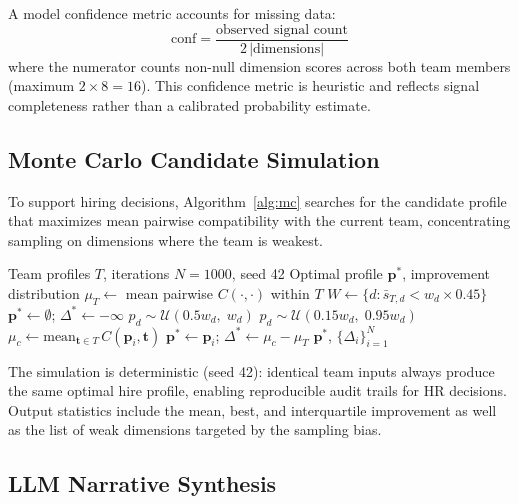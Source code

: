 \documentclass[conference]{IEEEtran}
\begin{document}
A model confidence metric accounts for missing data:
\begin{equation}
  \text{conf} = \frac{\text{observed signal count}}{2 \, |\text{dimensions}|}
  \label{eq:conf}
\end{equation}
where the numerator counts non-null dimension scores across both
team members (maximum $2 \times 8 = 16$).  This confidence metric is
heuristic and reflects signal completeness rather than a calibrated
probability estimate.

\subsection{Monte Carlo Candidate Simulation}

To support hiring decisions, Algorithm~\ref{alg:mc} searches for
the candidate profile that maximizes mean pairwise compatibility
with the current team, concentrating sampling on dimensions where
the team is weakest.

\begin{algorithm}[t]
\caption{Monte Carlo Candidate Simulation}
\label{alg:mc}
\begin{algorithmic}[1]
\REQUIRE Team profiles $T$, iterations $N{=}1000$, seed 42
\ENSURE Optimal profile $\mathbf{p}^*$, improvement distribution
\STATE $\mu_T \leftarrow$ mean pairwise $C(\cdot,\cdot)$ within $T$
\STATE $W \leftarrow \{d : \bar{s}_{T,d} < w_d \times 0.45\}$
\STATE $\mathbf{p}^* \leftarrow \emptyset$;\;
  $\Delta^* \leftarrow -\infty$
      $p_d \sim \mathcal{U}(0.5 w_d,\; w_d)$
    \ELSE
      \STATE $p_d \sim \mathcal{U}(0.15 w_d,\; 0.95 w_d)$
    \ENDIF
  \ENDFOR
  \STATE $\mu_c \leftarrow \mathrm{mean}_{\mathbf{t} \in T}\,C(\mathbf{p}_i, \mathbf{t})$
    \STATE $\mathbf{p}^* \leftarrow \mathbf{p}_i$;\;
      $\Delta^* \leftarrow \mu_c - \mu_T$
  \ENDIF
\ENDFOR
\RETURN $\mathbf{p}^*$, $\{\Delta_i\}_{i=1}^N$
\end{algorithmic}
\end{algorithm}

The simulation is deterministic (seed 42): identical team inputs
always produce the same optimal hire profile, enabling reproducible
audit trails for HR decisions.  Output statistics include the mean,
best, and interquartile improvement as well as the list of weak
dimensions targeted by the sampling bias.

\subsection{LLM Narrative Synthesis}
\end{document}
